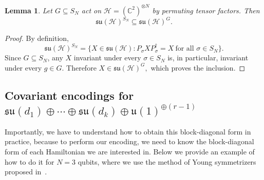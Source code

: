 \documentclass[11pt,letterpaper]{article}
\theoremstyle{plain}
\theoremstyle{plain}
\theoremstyle{plain}
\theoremstyle{plain}
\theoremstyle{plain}
\theoremstyle{plain}
\theoremstyle{plain}
\newtheorem{smlemma}[smtheorem]{Lemma}
\theoremstyle{definition}
\theoremstyle{plain}
\begin{document}
\begin{smlemma}\label{lem:subgroup_su_inclusion}
Let \(G\subseteq S_N\) act on \(\mathcal H=(\mathbb C^2)^{\otimes N}\) by permuting tensor factors. Then
\[
    \mathfrak{su}(\mathcal H)^{S_N}
    \subseteq
    \mathfrak{su}(\mathcal H)^G .
\]
\end{smlemma}

\begin{proof}
By definition,
\[
    \mathfrak{su}(\mathcal H)^{S_N}
    =
    \{X\in\mathfrak{su}(\mathcal H): P_\sigma X P_\sigma^\dagger=X
    \ \text{for all } \sigma\in S_N\}.
\]
Since \(G\subseteq S_N\), any \(X\) invariant under every \(\sigma\in S_N\) is, in particular, invariant under every \(g\in G\). Therefore
\(
    X\in\mathfrak{su}(\mathcal H)^G,
\)
which proves the inclusion.
\end{proof}

\subsection{Covariant encodings for \texorpdfstring{%
$\mathfrak{su}(d_1)\oplus\cdots\oplus\mathfrak{su}(d_k)\oplus \mathfrak{u}(1)^{\oplus(r-1)}$%
}{su(d1) plus ... plus su(dk) plus u(1)(r-1)}}
\label{subsec:supple_cov_block_enc}

Importantly, we have to understand how to obtain this block-diagonal form in practice, because to perform our encoding, we need to know the block-diagonal form of each Hamiltonian we are interested in.
Below we provide an example of how to do it for $N=3$ qubits, where we use the method of Young symmetrizers proposed in~\cite{DAlessandroHartwig2021}.
\end{document}
